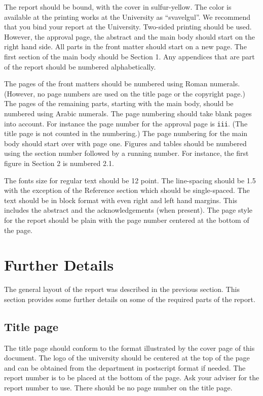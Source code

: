 \documentclass[12pt,twoside]{kau_report}
\begin{document}
The report should be bound, with the cover in sulfur-yellow. The
color is available at the printing works at the University as
``svavelgul''. %
We recommend that you bind your report
at the University. Two-sided printing
should be used. However, the approval page, the abstract and the main body
should start on the right hand side. All parts in the front matter
should start on a new page.
The first section of the main body should be Section 1. Any appendices
that are part of the report should be 
numbered alphabetically. 

The pages of the front matters should be
numbered using Roman numerals. (However, no page numbers are used on the title
page or the copyright page.)
The pages of the remaining parts, starting with the main body, should
be numbered 
using Arabic numerals. The page numbering should take
blank pages into account. For instance the page number for the approval
page is {\tt iii}. (The title page is not counted in the numbering.)
The page numbering for the main body should start
over with page one. Figures and tables should be numbered using the
section number followed by a running number. For instance, the first
figure in Section 2 is numbered 2.1.

The fonts size for regular text should be 12 point. The line-spacing
should be 1.5 with the exception of the Reference section which should
be single-spaced. The text should be in block format with even right and
left hand margins. This includes the abstract and the acknowledgements
(when present). The page style for the report should be plain with the page
number centered at the bottom of the page.

\section{Further Details}
The general layout of the report was described in the previous
section. This section provides some further details on some of the
required parts of the report.

\subsection{Title page}
The title page should conform to the format illustrated by the
cover page of this document. The logo of the university should be
centered at the top of the page and can be obtained from the
department in postscript format if needed.  The report number is to be
placed at the bottom of the page.
Ask your adviser for the report number to use. There
should be no page number on the title page.
\end{document}

